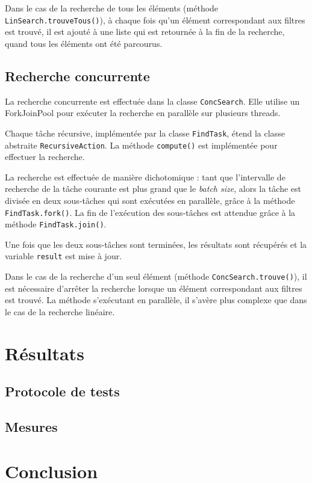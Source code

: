 \documentclass[
  french,
  a4paper,
]{scrartcl}
\begin{document}
Dans le cas de la recherche de tous les éléments (méthode \lstinline|LinSearch.trouveTous()|),
à chaque fois qu'un élément correspondant aux filtres est trouvé, il est ajouté à
une liste qui est retournée à la fin de la recherche, quand tous les éléments ont été
parcourus.

\subsection{Recherche concurrente}

La recherche concurrente est effectuée dans la classe \lstinline|ConcSearch|.
Elle utilise un ForkJoinPool pour exécuter la recherche en parallèle sur plusieurs threads.

Chaque tâche récursive, implémentée par la classe \lstinline|FindTask|, étend la 
classe abstraite \lstinline|RecursiveAction|. La méthode \lstinline|compute()| est 
implémentée pour effectuer la recherche. 

La recherche est effectuée de manière dichotomique : tant que l'intervalle de recherche 
de la tâche courante est plus grand que le \textit{batch size}, alors la tâche 
est divisée en deux sous-tâches qui sont exécutées en parallèle, grâce 
à la méthode \lstinline{FindTask.fork()}. La fin de l'exécution des sous-tâches 
est attendue grâce à la méthode \lstinline{FindTask.join()}.

Une fois que les deux sous-tâches sont terminées, les résultats sont récupérés 
et la variable \lstinline|result| est mise à jour. 

Dans le cas de la recherche d'un seul élément (méthode \lstinline|ConcSearch.trouve()|),
il est nécessaire d'arrêter la recherche lorsque un élément correspondant aux filtres
est trouvé. La méthode s'exécutant en parallèle, il s'avère plus complexe que 
dans le cas de la recherche linéaire. 



\section{Résultats}

\subsection{Protocole de tests}

\subsection{Mesures}

\section{Conclusion}
\end{document}
